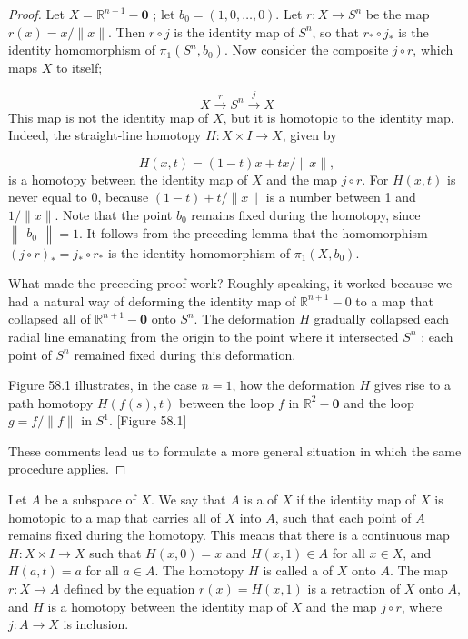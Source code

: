 \begin{proof}
Let \(X = \mathbb{R}^{n + 1} - \mathbf{0}\) ; let \(b_{0} = ( {1,0,\ldots, 0})\). Let \(r : X \rightarrow {S}^{n}\) be the map \(r(x) = x/\parallel x\parallel\). Then \(r \circ j\) is the identity map of \(S^{n}\), so that \(r_{ * } \circ {j}_{ * }\) is the identity homomorphism of \({\pi }_{1}( {S^{n},b_{0}})\).
Now consider the composite \(j \circ r\), which maps \(X\) to itself;

\[
X\overset{r}{ \rightarrow }S^{n}\overset{j}{ \rightarrow }X
\]
This map is not the identity map of \(X\), but it is homotopic to the identity map. Indeed, the straight-line homotopy \(H : X \times I \rightarrow X\), given by

\[
H( {x,t}) = ( {1 - t}) x + {tx}/\parallel x\parallel ,
\]
is a homotopy between the identity map of \(X\) and the map \(j \circ r\). For \(H( {x,t})\) is never equal to 0, because \(( {1 - t}) + t/\parallel x\parallel\) is a number between 1 and \(1/\parallel x\parallel\). Note that the point \(b_{0}\) remains fixed during the homotopy, since \(\begin{Vmatrix}b_{0}\end{Vmatrix} = 1\). It follows from the preceding lemma that the homomorphism \({( j \circ r) }_{ * } = j_{ * } \circ {r}_{ * }\) is the identity homomorphism of \({\pi }_{1}( {X,b_{0}})\).

What made the preceding proof work? Roughly speaking, it worked because we had a natural way of deforming the identity map of \(\mathbb{R}^{n + 1} - 0\) to a map that collapsed all of \(\mathbb{R}^{n + 1} - \mathbf{0}\) onto \(S^{n}\). The deformation \(H\) gradually collapsed each radial line emanating from the origin to the point where it intersected \(S^{n}\) ; each point of \(S^{n}\) remained fixed during this deformation.

Figure 58.1 illustrates, in the case \(n = 1\), how the deformation \(H\) gives rise to a path homotopy \(H( {f( s),t})\) between the loop \(f\) in \(\mathbb{R}^{2} - \mathbf{0}\) and the loop \(g = f/\parallel f\parallel\) in \(S^{1}\).
[Figure 58.1]

These comments lead us to formulate a more general situation in which the same procedure applies.
\end{proof}
\begin{definition}
Let \(A\) be a subspace of \(X\). We say that \(A\) is a  of \(X\) if the identity map of \(X\) is homotopic to a map that carries all of \(X\) into \(A\), such that each point of \(A\) remains fixed during the homotopy. This means that there is a continuous map \(H : X \times I \rightarrow X\) such that \(H( {x,0}) = x\) and \(H( {x,1}) \in A\) for all \(x \in X\), and \(H( {a,t}) = a\) for all \(a \in A\). The homotopy \(H\) is called a  of \(X\) onto \(A\). The map \(r : X \rightarrow A\) defined by the equation \(r(x) = H( {x,1})\) is a retraction of \(X\) onto \(A\), and \(H\) is a homotopy between the identity map of \(X\) and the map \(j \circ r\), where \(j : A \rightarrow X\) is inclusion.
\end{definition}

